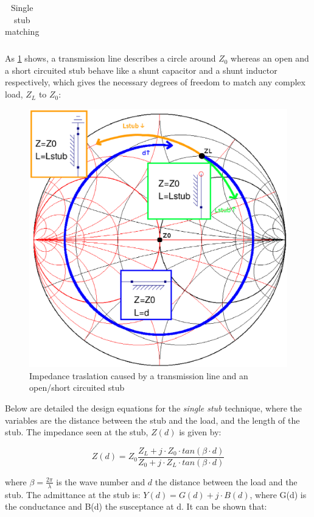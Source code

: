 \begin{table}[H]
\begin{tabular}{ | c | c | }
\begin{minipage}{.4\textwidth}
    \end{minipage}
    \\ \hline
  \end{tabular}
  \caption{Single stub matching}
  \label{tbl:sngstub}
\end{table}


As \ref{fig:SmithTL} shows, a transmission line describes a circle around $Z_0$ whereas an open and a short circuited stub behave like a shunt capacitor and a shunt inductor respectively, which gives the necessary degrees of freedom to match any complex load, $Z_L$ to $Z_0$:

\begin{figure}[H]
\centering
\includegraphics[width=120mm]{SmithChartTL}
\caption{Impedance traslation caused by a transmission line and an open/short circuited stub}
\label{fig:SmithTL}
\end{figure}


\noindent Below are detailed the design equations for the \textit{single stub} technique, where the variables are the distance between the stub and the load, and the length of the stub. The impedance seen at the stub, $Z(d)$ is given by:

\begin{equation}
Z(d) = Z_0 \frac{Z_L + j\cdot Z_0\cdot tan(\beta \cdot d)}{Z_0 + j\cdot Z_L \cdot tan(\beta \cdot d)}
\end{equation}

\noindent where $\beta = \frac{2\pi}{\lambda}$ is the wave number and $d$ the distance between the load and the stub. The admittance at the stub is: $Y(d) = G(d)+j \cdot B(d)$, where G(d) is the conductance and B(d) the susceptance at d. It can be shown that:

